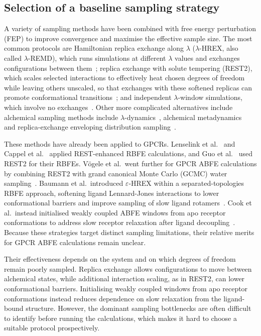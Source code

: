 \subsection{Selection of a baseline sampling strategy}

A variety of sampling methods have been combined with free energy perturbation (FEP) to improve convergence and maximise the effective sample size. The most common protocols are Hamiltonian replica exchange along $\lambda$ ($\lambda$-HREX, also called $\lambda$-REMD), which runs simulations at different $\lambda$ values and exchanges configurations between them~\cite{jiang2010free}; replica exchange with solute tempering (REST2), which scales selected interactions to effectively heat chosen degrees of freedom while leaving others unscaled, so that exchanges with these softened replicas can promote conformational transitions~\cite{wang2011replica}; and independent $\lambda$-window simulations, which involve no exchanges~\cite{mey2020best}. Other more complicated alternatives include alchemical sampling methods include $\lambda$-dynamics~\cite{kong1996lambda}, alchemical metadynamics~\cite{hsu2023alchemical} and replica-exchange enveloping distribution sampling~\cite{sidler2016replica}.

These methods have already been applied to GPCRs. Lenselink et al.~\cite{lenselink2016predicting} and Cappel et al.~\cite{cappel2016relative} applied REST-enhanced RBFE calculations, and Guo et al.~\cite{guo2023benchmark} used REST2 for their RBFEs. V\"ogele et al.\ went further for GPCR ABFE calculations by combining REST2 with grand canonical Monte Carlo (GCMC) water sampling~\cite{vogele2023functional}. Baumann et al.\ introduced $\varepsilon$-HREX within a separated-topologies RBFE approach, softening ligand Lennard-Jones interactions to lower conformational barriers and improve sampling of slow ligand rotamers~\cite{baumann2023broadening}. Cook et al.\ instead initialised weakly coupled ABFE windows from apo receptor conformations to address slow receptor relaxation after ligand decoupling~\cite{cook2024challenges}. Because these strategies target distinct sampling limitations, their relative merits for GPCR ABFE calculations remain unclear.

Their effectiveness depends on the system and on which degrees of freedom remain poorly sampled. Replica exchange allows configurations to move between alchemical states, while additional interaction scaling, as in REST2, can lower conformational barriers. Initialising weakly coupled windows from apo receptor conformations instead reduces dependence on slow relaxation from the ligand-bound structure. However, the dominant sampling bottlenecks are often difficult to identify before running the calculations, which makes it hard to choose a suitable protocol prospectively.

